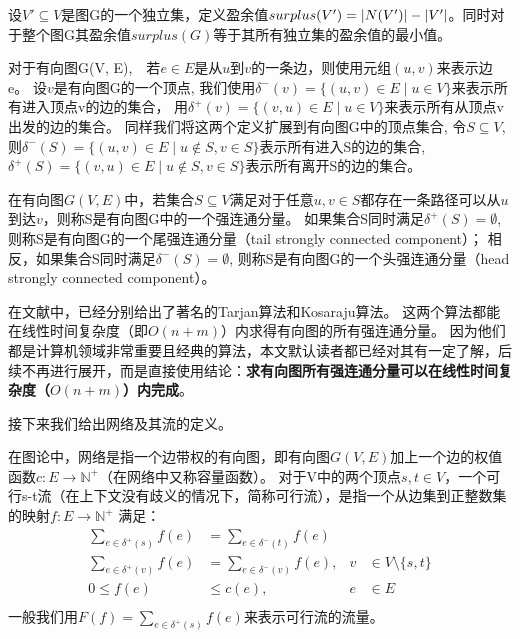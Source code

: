 设$V' \subseteq V$是图G的一个独立集，定义盈余值$surplus(V') = \left\vert N(V') \right\vert - \left\vert V' \right\vert$。同时对于整个图G其盈余值$surplus(G)$等于其所有独立集的盈余值的最小值。

对于有向图G(V, E),　若$e \in E$是从$u$到$v$的一条边，则使用元组$(u, v)$来表示边e。
设$v$是有向图G的一个顶点, 我们使用$\delta^-(v)=\{(u, v) \in E\;|\;u \in V\}$来表示所有进入顶点v的边的集合，
用$\delta^+(v)=\{(v, u) \in E\;|\;u \in V\}$来表示所有从顶点v出发的边的集合。
同样我们将这两个定义扩展到有向图G中的顶点集合, 令$S \subseteq V$,
则$\delta^-(S)=\{(u, v) \in E\;|\;u \notin S, v \in S\}$表示所有进入S的边的集合,
$\delta^+(S)=\{(v, u) \in E\;|\; u \notin S, v \in S\}$表示所有离开S的边的集合。

\begin{definition}
在有向图$G(V, E)$中，若集合$S \subseteq V$满足对于任意$u, v \in S$都存在一条路径可以从$u$到达$v$，则称S是有向图G中的一个强连通分量。
如果集合S同时满足$\delta^+(S) = \emptyset$, 则称S是有向图G的一个尾强连通分量（tail strongly connected component）；
相反，如果集合S同时满足$\delta^-(S) = \emptyset$, 则称S是有向图G的一个头强连通分量（head strongly connected component）。
\end{definition}

在文献\cite{tarjan1972depth,sharir1981strong}中，已经分别给出了著名的Tarjan算法和Kosaraju算法。
这两个算法都能在线性时间复杂度（即$O(n + m)$）内求得有向图的所有强连通分量。
因为他们都是计算机领域非常重要且经典的算法，本文默认读者都已经对其有一定了解，后续不再进行展开，而是直接使用结论：\textbf{求有向图所有强连通分量可以在线性时间复杂度（$O(n + m)$）内完成}。

接下来我们给出网络及其流的定义。

在图论中，网络是指一个边带权的有向图，即有向图$G(V, E)$加上一个边的权值函数$c: E \rightarrow \mathbb{N}^+$（在网络中又称容量函数）。
对于V中的两个顶点$s, t \in V$，一个可行s-t流（在上下文没有歧义的情况下，简称可行流），是指一个从边集到正整数集的映射$f: E \rightarrow \mathbb{N}^+$ 满足：
\begin{equation} \label{EquationFlow} \begin{aligned}
  \sum_{e\in \delta^+(s)}{f(e)}&=\sum_{e\in \delta^-(t)}{f(e)}& \\
  \sum_{e\in \delta^+(v)}{f(e)}&=\sum_{e\in \delta^-(v)}{f(e)}, & v &\in V \setminus \{s, t\} \\
  0 \le f(e) &\le c(e), & e &\in E \\
\end{aligned} \end{equation}
一般我们用$F(f)=\sum_{e\in \delta^+(s)}{f(e)}$来表示可行流的流量。

